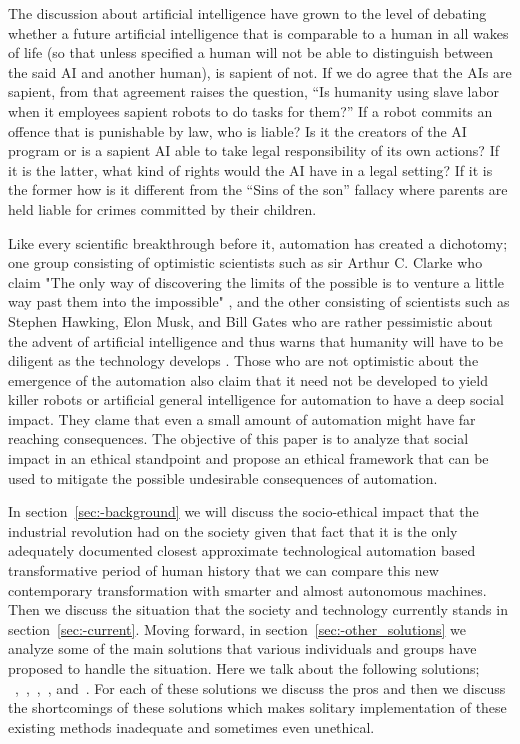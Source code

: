 The discussion about artificial intelligence have grown to the level of debating whether a future artificial intelligence that is comparable to a human in all wakes of life (so that unless specified a human will not be able to distinguish between the said AI and another human\cite{eyal1999turing}), is sapient of not. If we do agree that the AIs are sapient, from that agreement raises the question, “Is humanity using slave labor when it employees sapient robots to do tasks for them?” If a robot commits an offence that is punishable by law, who is liable? Is it the creators of the AI program or is a sapient AI able to take legal responsibility of its own actions? If it is the latter, what kind of rights would the AI have in a legal setting? If it is the former how is it different from the “Sins of the son” fallacy where parents are held liable for crimes committed by their children.  

Like every scientific breakthrough before it, automation has created a dichotomy; one group consisting of optimistic scientists such as sir Arthur C. Clarke who claim "The only way of discovering the limits of the possible is to venture a little way past them into the impossible" \cite{arthur1962limits}, and the other consisting of scientists such as Stephen Hawking, Elon Musk, and Bill Gates who are rather pessimistic about the advent of artificial intelligence and thus warns that humanity will have to be diligent as the technology develops \cite{michael2016warning}. Those who are not optimistic about the emergence of the automation also claim that it need not be developed to yield killer robots or artificial general intelligence \cite{luke2013agi} for automation to have a deep social impact. They clame that even a small amount of automation might have far reaching consequences.  The objective of this paper is to analyze that social impact in an ethical standpoint and propose an ethical framework that can be used to mitigate the possible undesirable consequences of automation. 

In section~\ref{sec:-background} we will discuss the socio-ethical impact that the industrial revolution had on the society given that fact that it is the only adequately documented closest approximate technological automation based transformative period of human history that we can compare this new contemporary transformation with smarter and almost autonomous machines. Then we discuss the situation that the society and technology currently stands in section~\ref{sec:-current}. Moving forward, in section~\ref{sec:-other_solutions}  we analyze some of the main solutions that various individuals and groups have proposed to handle the situation. Here we talk about the following solutions; ~,~,~,~, and~. For each of these solutions we discuss the pros and then we discuss the shortcomings of these solutions which makes solitary implementation of these existing methods inadequate and sometimes even unethical.

